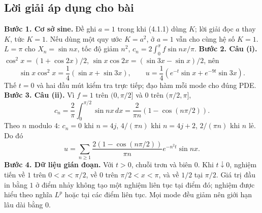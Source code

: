 \documentclass[10pt,a4paper]{article}
\begin{document}
\subsection*{Lời giải áp dụng cho bài}
\textbf{Bước 1. Cơ sở sine.} Đề ghi $a=1$ trong khi (4.1.1) dùng $K$; lời giải đọc $a$ thay $K$, tức $K=1$. Nếu dùng một quy ước $K=a^2$, ở $a=1$ vẫn cho cùng hệ số $K=1$. $L=\pi$ cho $X_n=\sin nx$, tốc độ giảm $n^2$, $c_n=2\int_0^\pi f\sin nx/\pi$.
\textbf{Bước 2. Câu (i).} $\cos^2x=(1+\cos2x)/2$, $\sin x\cos2x=(\sin3x-\sin x)/2$, nên
\[\sin x\cos^2x=\frac14(\sin x+\sin3x),\qquad
u=\frac14(e^{-t}\sin x+e^{-9t}\sin3x).\]
Thế $t=0$ và hai đầu mút kiểm tra trực tiếp; đạo hàm mỗi mode cho đúng PDE.
\textbf{Bước 3. Câu (ii).} Vì $f=1$ trên $(0,\pi/2]$ và $0$ trên $(\pi/2,\pi]$,
\[c_n=\frac2\pi\int_0^{\pi/2}\sin nx\,dx
=\frac2{\pi n}(1-\cos(n\pi/2)).\]
Theo $n$ modulo $4$: $c_n=0$ khi $n=4j$, $4/(\pi n)$ khi $n=4j+2$, $2/(\pi n)$ khi $n$ lẻ. Do đó
\[u=\sum_{n\ge1}\frac{2(1-\cos(n\pi/2))}{\pi n}e^{-n^2t}\sin nx.\]
\textbf{Bước 4. Dữ liệu gián đoạn.} Với $t>0$, chuỗi trơn và biên $0$. Khi $t\downarrow0$, nghiệm tiến về $1$ trên $0<x<\pi/2$, về $0$ trên $\pi/2<x<\pi$, và về $1/2$ tại $\pi/2$. Giá trị đầu in bằng $1$ ở điểm nhảy không tạo một nghiệm liên tục tại điểm đó; nghiệm được hiểu theo nghĩa $L^p$ hoặc tại các điểm liên tục. Mọi mode đều giảm nên giới hạn lâu dài bằng $0$.
\end{document}
